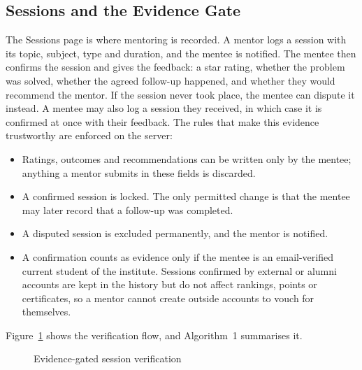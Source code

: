 \documentclass[12pt,a4paper]{report}
\begin{document}
\subsection{Sessions and the Evidence Gate}\label{sec:gate}
The Sessions page is where mentoring is recorded. A mentor logs a session with its topic, subject, type and duration, and the mentee is notified. The mentee then confirms the session and gives the feedback: a star rating, whether the problem was solved, whether the agreed follow-up happened, and whether they would recommend the mentor. If the session never took place, the mentee can dispute it instead. A mentee may also log a session they received, in which case it is confirmed at once with their feedback. The rules that make this evidence trustworthy are enforced on the server:
\begin{itemize}
\item Ratings, outcomes and recommendations can be written only by the mentee; anything a mentor submits in these fields is discarded.
\item A confirmed session is locked. The only permitted change is that the mentee may later record that a follow-up was completed.
\item A disputed session is excluded permanently, and the mentor is notified.
\item A confirmation counts as evidence only if the mentee is an email-verified current student of the institute. Sessions confirmed by external or alumni accounts are kept in the history but do not affect rankings, points or certificates, so a mentor cannot create outside accounts to vouch for themselves.
\end{itemize}
Figure~\ref{fig:gate} shows the verification flow, and Algorithm~1 summarises it.

\begin{figure}[h]
\centering
{}
\caption{Evidence-gated session verification}
\label{fig:gate}
\end{figure}
\end{document}
